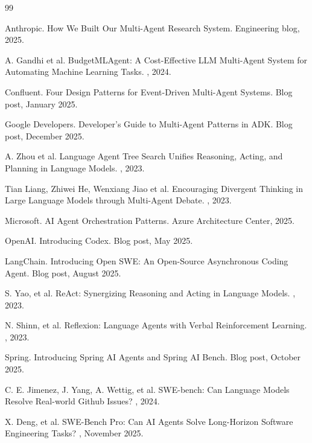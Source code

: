 \documentclass[11pt]{book}
\begin{document}
\begin{thebibliography}{99}

Anthropic.
\newblock How We Built Our Multi-Agent Research System.
\newblock Engineering blog, 2025.

A. Gandhi et al.
\newblock BudgetMLAgent: A Cost-Effective LLM Multi-Agent System for Automating Machine Learning Tasks.
, 2024.

Confluent.
\newblock Four Design Patterns for Event-Driven Multi-Agent Systems.
\newblock Blog post, January 2025.

Google Developers.
\newblock Developer's Guide to Multi-Agent Patterns in ADK.
\newblock Blog post, December 2025.

A. Zhou et al.
\newblock Language Agent Tree Search Unifies Reasoning, Acting, and Planning in Language Models.
, 2023.

Tian Liang, Zhiwei He, Wenxiang Jiao et al.
\newblock Encouraging Divergent Thinking in Large Language Models through Multi-Agent Debate.
, 2023.

Microsoft.
\newblock AI Agent Orchestration Patterns.
\newblock Azure Architecture Center, 2025.

OpenAI.
\newblock Introducing Codex.
\newblock Blog post, May 2025.

LangChain.
\newblock Introducing Open SWE: An Open-Source Asynchronous Coding Agent.
\newblock Blog post, August 2025.

S. Yao, et al.
\newblock ReAct: Synergizing Reasoning and Acting in Language Models.
, 2023.

N. Shinn, et al.
\newblock Reflexion: Language Agents with Verbal Reinforcement Learning.
, 2023.

Spring.
\newblock Introducing Spring AI Agents and Spring AI Bench.
\newblock Blog post, October 2025.

C. E. Jimenez, J. Yang, A. Wettig, et al.
\newblock SWE-bench: Can Language Models Resolve Real-world Github Issues?
, 2024.

X. Deng, et al.
\newblock SWE-Bench Pro: Can AI Agents Solve Long-Horizon Software Engineering Tasks?
, November 2025.


\end{thebibliography}
\end{document}
